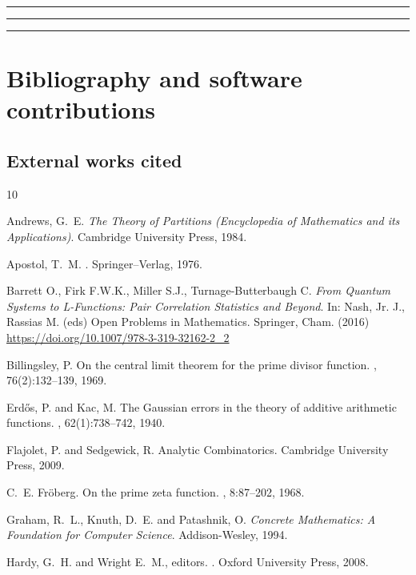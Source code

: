 \documentclass[10pt,reqno,letterpaper]{article}
\theoremstyle{plain}
\numberwithin{theorem}{section}
\theoremstyle{definition}
\renewcommand{\thesection}{\arabic{section}}
\newcounter{completeBibitemIncrementCtr}
\renewenvironment{thebibliography}[1]{
     \renewcommand{\refname}{} 
     
     \begin{oldthebibliography}{#1}
     \setlength{\itemsep}{0em}
     \setlength{\parskip}{0em}
     \setlength{\topsep}{0pt}
     \setlength{\partopsep}{0pt}
     \setcounter{enumiv}{\value{completeBibitemIncrementCtr}}
     \footnotesize 
}
{
     \setcounter{completeBibitemIncrementCtr}{\value{enumiv}}
     \end{oldthebibliography}
}
\begin{document}
\bigskip\hrule\hrule\hrule\bigskip
\renewcommand{\thesection}{B}
\section{Bibliography and software contributions} 
\label{page_Section_BibliographyB} 

\vskip 0.1in
\subsection{External works cited}

\begin{thebibliography}{10}

Andrews, G.~E. \emph{The Theory of Partitions (Encyclopedia of Mathematics and its Applications)}. 
Cambridge University Press, 1984.

Apostol, T.~M.
.
\newblock Springer--Verlag, 1976.

Barrett O., Firk F.W.K., Miller S.J., Turnage-Butterbaugh C. 
\emph{From Quantum Systems to L-Functions: Pair Correlation Statistics and Beyond}. 
In: Nash, Jr. J., Rassias M. (eds) Open Problems in Mathematics. Springer, Cham. (2016) 
\url{https://doi.org/10.1007/978-3-319-32162-2_2}

Billingsley, P.
\newblock On the central limit theorem for the prime divisor function.
, 76(2):132--139, 1969.

Erd{\H{o}}s, P. and Kac, M.
\newblock The Gaussian errors in the theory of additive arithmetic functions.
, 62(1):738--742, 1940.

Flajolet, P. and Sedgewick, R. Analytic Combinatorics. Cambridge University Press, 2009.

C.~E. Fr{\"{o}}berg.
\newblock On the prime zeta function.
, 8:87--202, 1968.

Graham, R.~L., Knuth, D.~E. and Patashnik, O. 
\emph{Concrete Mathematics: A Foundation for Computer Science}. Addison-Wesley, 1994.

Hardy, G.~H. and Wright E.~M., editors.
.
\newblock Oxford University Press, 2008.


\end{thebibliography}
\end{document}
